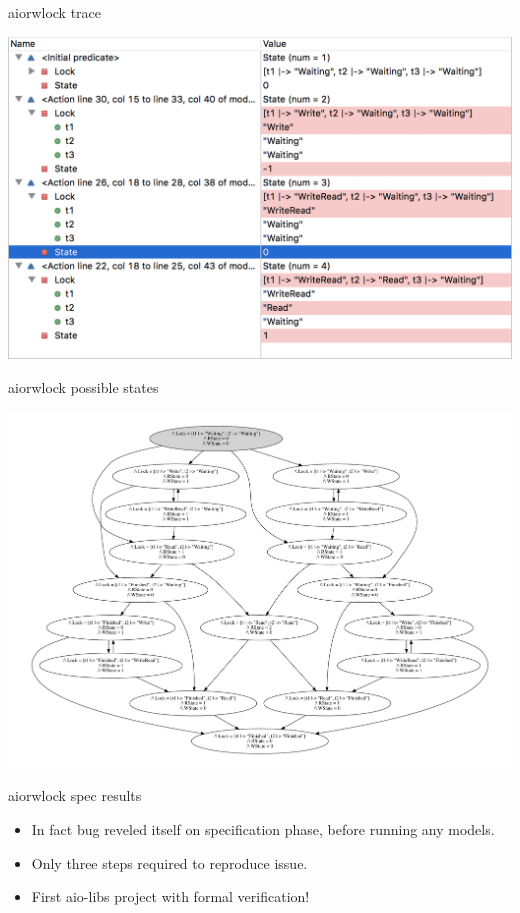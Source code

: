 \documentclass[12pt]{beamer}
\begin{document}
  \begin{frame}{aiorwlock trace}
      \begin{center}
          \includegraphics[scale=0.45]{figures/tla_trace}
      \end{center}
  \end{frame}
  \begin{frame}{aiorwlock possible states}
      \begin{center}
          \includegraphics[scale=0.35,angle=90]{figures/aiorwlock_model}
      \end{center}
  \end{frame}
  \begin{frame}{aiorwlock spec results}
    \begin{itemize}
      \item In fact bug reveled itself on specification phase, before
          running any models.
      \item Only three steps required to reproduce issue.
      \item First aio-libs project with formal verification!
    \end{itemize}
  \end{frame}
\end{document}
